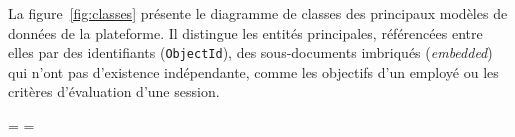 La figure~\ref{fig:classes} présente le diagramme de classes des principaux modèles
de données de la plateforme. Il distingue les entités principales, référencées entre elles par des
identifiants (\texttt{ObjectId}), des sous-documents imbriqués (\textit{embedded}) qui
n'ont pas d'existence indépendante, comme les objectifs d'un employé ou les critères
d'évaluation d'une session.

\clearpage
\begingroup


\setlength{\paperwidth}{297mm}
\setlength{\paperheight}{420mm}
\pdfpagewidth=\paperwidth
\pdfpageheight=\paperheight


\setlength{\textwidth}{267mm}
\setlength{\textheight}{370mm}

\makeatletter
\setlength{\@colht}{\textheight}
\setlength{\@colroom}{\textheight}
\setlength{\vsize}{\textheight}
\makeatother


\setlength{\hoffset}{0mm}
\setlength{\oddsidemargin}{-10.4mm}
\setlength{\evensidemargin}{-10.4mm}


\setlength{\topmargin}{-15mm}
\setlength{\headheight}{8mm}
\setlength{\headsep}{8mm}

\setlength{\headwidth}{\textwidth}
\fancyheadoffset[L,R]{0pt}


\setlength{\footskip}{12mm}

\fancyfoot{}
\fancyfoot[C]{\thepage}

\thispagestyle{fancy}


